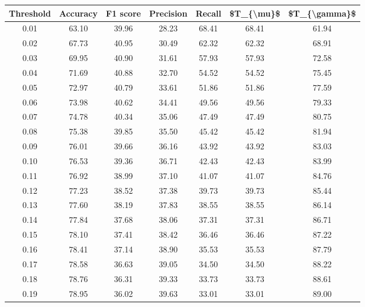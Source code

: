 \begin{tabular}{|c|c|c|c|c|c|c|}
\hline
 Threshold &  Accuracy &  F1 score &  Precision &  Recall &  \$T\_\{\textbackslash mu\}\$ &  \$T\_\{\textbackslash gamma\}\$ \\
\hline
      0.01 &     63.10 &     39.96 &      28.23 &   68.41 &      68.41 &         61.94 \\
      0.02 &     67.73 &     40.95 &      30.49 &   62.32 &      62.32 &         68.91 \\
      0.03 &     69.95 &     40.90 &      31.61 &   57.93 &      57.93 &         72.58 \\
      0.04 &     71.69 &     40.88 &      32.70 &   54.52 &      54.52 &         75.45 \\
      0.05 &     72.97 &     40.79 &      33.61 &   51.86 &      51.86 &         77.59 \\
      0.06 &     73.98 &     40.62 &      34.41 &   49.56 &      49.56 &         79.33 \\
      0.07 &     74.78 &     40.34 &      35.06 &   47.49 &      47.49 &         80.75 \\
      0.08 &     75.38 &     39.85 &      35.50 &   45.42 &      45.42 &         81.94 \\
      0.09 &     76.01 &     39.66 &      36.16 &   43.92 &      43.92 &         83.03 \\
      0.10 &     76.53 &     39.36 &      36.71 &   42.43 &      42.43 &         83.99 \\
      0.11 &     76.92 &     38.99 &      37.10 &   41.07 &      41.07 &         84.76 \\
      0.12 &     77.23 &     38.52 &      37.38 &   39.73 &      39.73 &         85.44 \\
      0.13 &     77.60 &     38.19 &      37.83 &   38.55 &      38.55 &         86.14 \\
      0.14 &     77.84 &     37.68 &      38.06 &   37.31 &      37.31 &         86.71 \\
      0.15 &     78.10 &     37.41 &      38.42 &   36.46 &      36.46 &         87.22 \\
      0.16 &     78.41 &     37.14 &      38.90 &   35.53 &      35.53 &         87.79 \\
      0.17 &     78.58 &     36.63 &      39.05 &   34.50 &      34.50 &         88.22 \\
      0.18 &     78.76 &     36.31 &      39.33 &   33.73 &      33.73 &         88.61 \\
      0.19 &     78.95 &     36.02 &      39.63 &   33.01 &      33.01 &         89.00 \\

\end{tabular}
